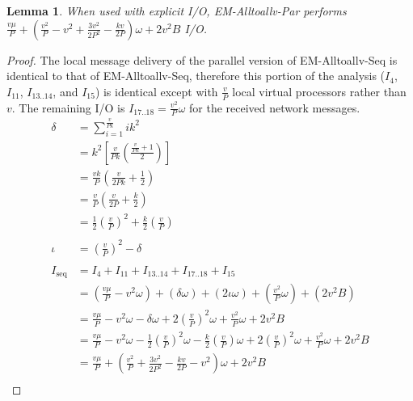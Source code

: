 \documentclass[12pt]{carletoncsthesis}
\newtheorem{lemma}[thm]{Lemma}
\begin{document}
\begin{lemma}
\label{alltoall-direct-par-io}
When used with explicit I/O, {\sc EM-Alltoallv-Par} performs
$
\frac{v\mu}{P}
	+ \left( \frac{v^2}{P} - v^2
	        + \frac{3v^2}{2P^2}
	        - \frac{kv}{2P}
	  \right) \omega
	+ 2v^2B
$ I/O.
\end{lemma}
\begin{proof}
The local message delivery of the parallel version of {\sc EM-Alltoallv-Seq}
is identical to that of {\sc EM-Alltoallv-Seq}, therefore this portion of
the analysis ($I_{4}$,  $I_{11}$, $I_{13..14}$, and $I_{15}$) is identical
except with $\frac{v}{P}$ local virtual processors rather than $v$.  The remaining
I/O is $I_{17..18} = \frac{v^2}{P}\omega$ for the received network messages.
\\
\[
\begin{aligned}
\delta	&= \displaystyle\sum_{i=1}^{\frac{v}{Pk}} ik^2 \\
		&= k^2 \left[\frac{v}{Pk}\left(\frac{\frac{v}{Pk}+1}{2}\right)\right] \\
&= \frac{vk}{P}\left(\frac{v}{2Pk} + \frac{1}{2}\right) \\
		&= \frac{v}{P}\left(\frac{v}{2P} + \frac{k}{2}\right) \\
		&= \frac{1}{2}\left(\frac{v}{P}\right)^2 + \frac{k}{2}\left(\frac{v}{P}\right) \\
\\
\iota	&= \left(\frac{v}{P}\right)^2 - \delta \\
\\
I_{\text{seq}} &= I_{4} + I_{11} + I_{13..14} + I_{17..18} + I_{15} \\
&=	  \left( \frac{v\mu}{P} - v^2\omega \right)
	+ \left( \delta \omega \right)
	+ \left( 2\iota\omega \right)
	+ \left( \frac{v^2}{P}\omega \right)
	+ \left( 2v^2B \right) \\
&=	\frac{v\mu}{P} - v^2\omega - \delta\omega + 2\left(\frac{v}{P}\right)^2\omega
	+ \frac{v^2}{P}\omega + 2v^2B \\
&=	\frac{v\mu}{P} - v^2\omega
	- \frac{1}{2}\left(\frac{v}{P}\right)^2\omega
    - \frac{k}{2}\left(\frac{v}{P}\right)\omega
	+ 2\left(\frac{v}{P}\right)^2\omega
	+ \frac{v^2}{P}\omega + 2v^2B \\
&=	\frac{v\mu}{P}
	+ \left( \frac{v^2}{P}
	        + \frac{3v^2}{2P^2}
	        - \frac{kv}{2P}
			- v^2
	  \right) \omega
	+ 2v^2B \\
\end{aligned}
\]
\end{proof}
\end{document}
